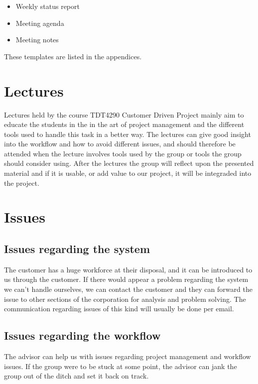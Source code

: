 \begin{itemize}
\item Weekly status report
\item Meeting agenda
\item Meeting notes
\end{itemize}

These templates are listed in the appendices.



\section{Lectures}
Lectures held by the course TDT4290 Customer Driven Project mainly aim to educate the students in the in the art of project management and the different tools used to handle this task in a better way. The lectures can give good insight into the workflow and how to avoid different issues, and should therefore be attended when the lecture involves tools used by the group or tools the group should consider using. After the lectures the group will reflect upon the presented material and if it is usable, or add value to our project, it will be integraded into the project.

\section{Issues}
\subsection{Issues regarding  the system}
The customer has a huge workforce at their disposal, and it can be introduced to us through the customer. If there would appear a problem regarding the system we can’t handle ourselves, we can contact the customer and they can forward the issue to other sections of the corporation for analysis and problem solving. The communication regarding issues of this kind will usually be done per email. 

\subsection{Issues regarding the workflow}
The advisor can help us with issues regarding project management and workflow issues. If the group were to be stuck at some point, the advisor can jank the group out of the ditch and set it back on track. 


